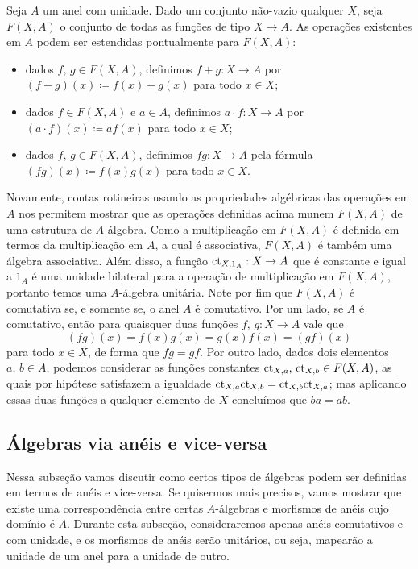 \begin{exem}\label{exem:algebra_funcoes}
  Seja $A$ um anel com unidade.
  Dado um conjunto não-vazio qualquer $X$, seja $F(X,A)$ o conjunto de todas as funções de tipo $X \to A$.
  As operações existentes em $A$ podem ser estendidas pontualmente para $F(X,A)$:
  \begin{itemize}
  \item dados $f,\, g \in F(X,A)$, definimos $f+g: X \to A$ por $(f+g)(x) \coloneqq f(x) + g(x)$ para todo $x \in X$;
    
  \item dados $f \in F(X,A)$ e $a \in A$, definimos $a \cdot f: X \to A$ por $(a \cdot f)(x) \coloneqq af(x)$ para todo $x \in X$;
    
  \item dados $f,\, g \in F(X,A)$, definimos $fg: X \to A$ pela fórmula $(fg)(x) \coloneqq f(x)g(x)$ para todo $x \in X$.
  \end{itemize}

  Novamente, contas rotineiras usando as propriedades algébricas das operações em $A$ nos permitem mostrar que as operações definidas acima munem $F(X,A)$ de uma estrutura de $A$-álgebra.
  Como a multiplicação em $F(X,A)$ é definida em termos da multiplicação em $A$, a qual é associativa, $F(X,A)$ é também uma álgebra associativa.
  Além disso, a função $\mathrm{ct}_{X,1_A}: X \to A$ que é constante e igual a $1_A$ é uma unidade bilateral para a operação de multiplicação em $F(X,A)$, portanto temos uma $A$-álgebra unitária.
  Note por fim que $F(X,A)$ é comutativa se, e somente se, o anel $A$ é comutativo.
  Por um lado, se $A$ é comutativo, então para quaisquer duas funções $f,\,g: X \to A$ vale que
  \begin{displaymath}
    (fg)(x) = f(x)g(x) = g(x)f(x) = (gf)(x)
  \end{displaymath}
  para todo $x \in X$, de forma que $fg=gf$.
  Por outro lado, dados dois elementos $a,\,b \in A$, podemos considerar as funções constantes $\mathrm{ct}_{X,a},\, \mathrm{ct}_{X,b} \in F(X,A)$, as quais por hipótese satisfazem a igualdade $\mathrm{ct}_{X,a}\mathrm{ct}_{X,b} = \mathrm{ct}_{X,b}\mathrm{ct}_{X,a}$; mas aplicando essas duas funções a qualquer elemento de $X$ concluímos que $ba = ab$.
\end{exem}

\subsection{Álgebras via anéis e vice-versa}

Nessa subseção vamos discutir como certos tipos de álgebras podem ser definidas em termos de anéis e vice-versa.
Se quisermos mais precisos, vamos mostrar que existe uma correspondência entre certas $A$-álgebras e morfismos de anéis cujo domínio é $A$.
Durante esta subseção, consideraremos apenas anéis comutativos e com unidade, e os morfismos de anéis  serão unitários, ou seja, mapearão a unidade de um anel para a unidade de outro.

